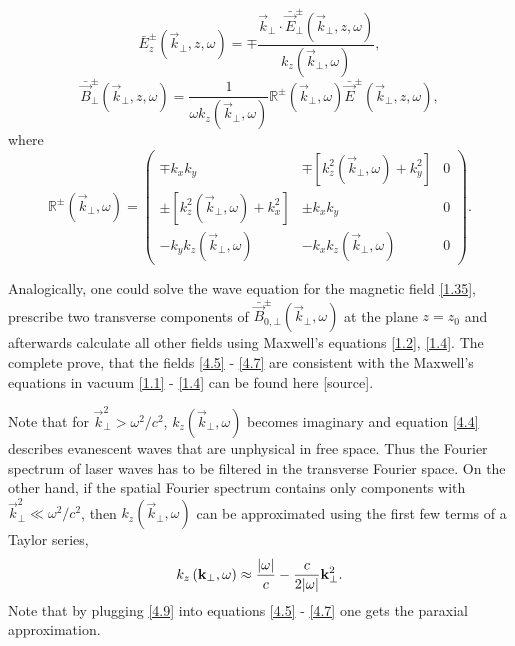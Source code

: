 \begin{equation}
\label{4.6}
\bar{E}^{\pm}_z \left(\vec{k}_\bot, z, \omega \right) = \mp \frac{\vec{k}_\bot \cdot \bar{\vec{E}}^{\pm}_{\bot}(\vec{k}_\bot, z, \omega)}{k_z \left(\vec{k}_\bot, \omega \right)},
\end{equation}
\begin{equation}
\label{4.7}
\bar{\vec{B}}^{\pm}_{\bot} \left(\vec{k}_\bot, z, \omega \right) = \frac{1}{\omega k_z \left(\vec{k}_\bot, \omega \right)} \mathbb{R}^{\pm} \left(\vec{k}_\bot, \omega \right) \bar{\vec{E}}^{\pm} \left(\vec{k}_\bot, z, \omega \right),
\end{equation}
where
\begingroup
\renewcommand*{\arraystretch}{1.7}
\begin{equation}
\label{4.8}
\mathbb{R}^{\pm} \left(\vec{k}_\bot, \omega \right) =  \begin{pmatrix}
\mp k_x k_y & \mp \left[ k_z^2 \left(\vec{k}_\bot, \omega \right) + k_y^2 \right] & 0 \\
\pm \left[ k_z^2 \left(\vec{k}_\bot, \omega \right) + k_x^2 \right] & \pm k_x k_y & 0 \\
- k_y k_z \left(\vec{k}_\bot, \omega \right) & - k_x k_z \left(\vec{k}_\bot, \omega \right) & 0
\end{pmatrix}.
\end{equation} 
\endgroup

Analogically, one could solve the wave equation for the magnetic field \ref{1.35}, prescribe two transverse components of $ \bar{\vec{B}}_{0, \bot}^{\pm}\left(\vec{k}_\bot, \omega \right) $ at the plane $ z = z_0 $ and afterwards calculate all other fields using Maxwell's equations \ref{1.2}, \ref{1.4}. The complete prove, that the fields \ref{4.5} - \ref{4.7} are consistent with the Maxwell's equations in vacuum \ref{1.1} - \ref{1.4} can be found here [source].

Note that for $ \vec{k}_\bot^2 > \omega^2/c^2 $, $ k_z \left(\vec{k}_\bot, \omega \right) $ becomes imaginary and equation \ref{4.4} describes evanescent waves that are unphysical in free space. Thus the Fourier spectrum of laser waves has to be filtered in the transverse Fourier space. On the other hand, if the spatial Fourier spectrum contains only components with $ \vec{k}_\bot^2 \ll \omega^2/c^2 $, then $ k_z \left(\vec{k}_\bot, \omega \right) $ can be approximated using the first few terms of a Taylor series,
\begin{equation}
\label{4.9}
k_z \left(\mathbf{k}_\bot, \omega \right) \approx \frac{\lvert\omega\rvert}{c} - \frac{c}{2 \lvert\omega\rvert} \mathbf{k}_\bot^2.
\end{equation}
Note that by plugging \ref{4.9} into equations \ref{4.5} - \ref{4.7} one gets the paraxial approximation.

